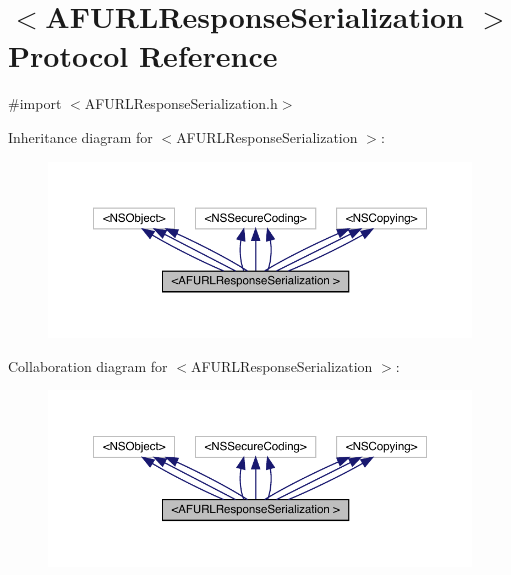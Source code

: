 \hypertarget{protocol_a_f_u_r_l_response_serialization_01-p}{}\section{$<$A\+F\+U\+R\+L\+Response\+Serialization $>$ Protocol Reference}
\label{protocol_a_f_u_r_l_response_serialization_01-p}


{\ttfamily \#import $<$A\+F\+U\+R\+L\+Response\+Serialization.\+h$>$}



Inheritance diagram for $<$A\+F\+U\+R\+L\+Response\+Serialization $>$\+:\nopagebreak
\begin{figure}[H]
\begin{center}
\leavevmode
\includegraphics[width=350pt]{protocol_a_f_u_r_l_response_serialization_01-p__inherit__graph}
\end{center}
\end{figure}


Collaboration diagram for $<$A\+F\+U\+R\+L\+Response\+Serialization $>$\+:\nopagebreak
\begin{figure}[H]
\begin{center}
\leavevmode
\includegraphics[width=350pt]{protocol_a_f_u_r_l_response_serialization_01-p__coll__graph}
\end{center}
\end{figure}
